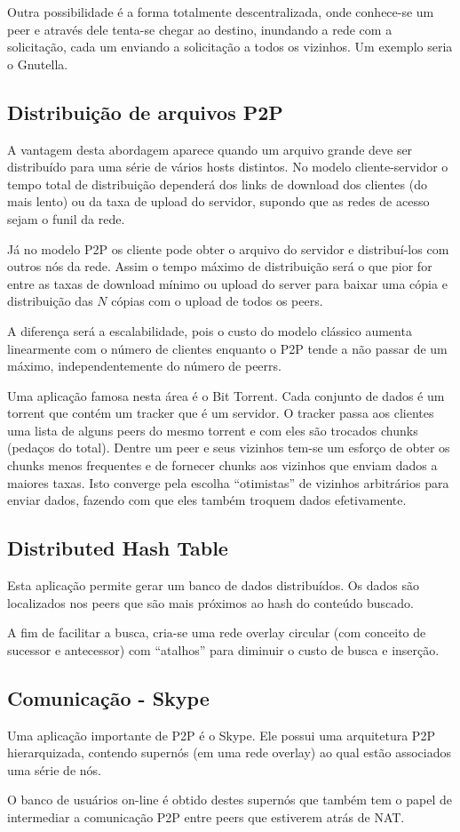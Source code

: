 Outra possibilidade é a forma totalmente descentralizada, onde conhece-se um peer e através dele tenta-se chegar ao destino, inundando a rede com a solicitação, cada um enviando a solicitação a todos os vizinhos. Um exemplo seria o Gnutella.

\subsection{Distribuição de arquivos P2P}

A vantagem desta abordagem aparece quando um arquivo grande deve ser distribuído para uma série de vários hosts distintos.
No modelo cliente-servidor o tempo total de distribuição dependerá dos links de download dos clientes (do mais lento) ou da taxa de upload do servidor,
supondo que as redes de acesso sejam o funil da rede.

Já no modelo P2P os cliente pode obter o arquivo do servidor e distribuí-los com outros nós da rede.
Assim o tempo máximo de distribuição será o que pior for entre as taxas de download mínimo ou upload do server para baixar uma cópia
e distribuição das $N$ cópias com o upload de todos os peers.

A diferença será a escalabilidade, pois o custo do modelo clássico aumenta linearmente com o número de clientes enquanto o P2P tende a não passar de um máximo, independentemente do número de peerrs.

Uma aplicação famosa nesta área é o Bit Torrent. 
Cada conjunto de dados é um torrent que contém um tracker que é um servidor.
O tracker passa aos clientes uma lista de alguns peers do mesmo torrent e com eles são trocados chunks (pedaços do total).
Dentre um peer e seus vizinhos tem-se um esforço de obter os chunks menos frequentes e de fornecer chunks aos vizinhos que enviam dados a maiores taxas.
Isto converge pela escolha ``otimistas'' de vizinhos arbitrários para enviar dados, fazendo com que eles também troquem dados efetivamente.

\subsection{Distributed Hash Table}

Esta aplicação permite gerar um banco de dados distribuídos.
Os dados são localizados nos peers que são mais próximos ao hash do conteúdo buscado.

A fim de facilitar a busca, cria-se uma rede overlay circular (com conceito de sucessor e antecessor) com ``atalhos'' para diminuir o custo de busca e inserção.

\subsection{Comunicação - Skype}

Uma aplicação importante de P2P é o Skype.
Ele possui uma arquitetura P2P hierarquizada, contendo supernós (em uma rede overlay) ao qual estão associados uma série de nós.

O banco de usuários on-line é obtido destes supernós que também tem o papel de intermediar a comunicação P2P entre peers que estiverem atrás de NAT.

